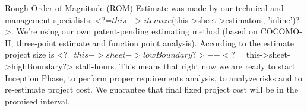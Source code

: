 
Rough-Order-of-Magnitude (ROM) Estimate was made by our technical and 
management specialists: 
<?=$this->itemize($this->sheet->estimators, 'inline')?>.
We're using our own patent-pending estimating method (based on COCOMO-II, 
three-point estimate and function point analysis).
According to the estimate
project size is
<?=$this->sheet->lowBoundary?>--<?=$this->sheet->highBoundary?>{} staff-hours. 
This means that right now we are ready to start Inception Phase,
to perform proper requirements analysis, 
to analyze risks and to re-estimate project cost.
We guarantee that final fixed project cost will be in the promised interval.
